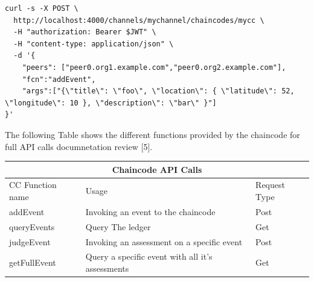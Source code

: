 \begin{lstlisting}[caption={Simple REST API Call Using Curl},captionpos=b]
curl -s -X POST \
  http://localhost:4000/channels/mychannel/chaincodes/mycc \
  -H "authorization: Bearer $JWT" \
  -H "content-type: application/json" \
  -d '{
	"peers": ["peer0.org1.example.com","peer0.org2.example.com"],
	"fcn":"addEvent",
	"args":["{\"title\": \"foo\", \"location\": { \"latitude\": 52, \"longitude\": 10 }, \"description\": \"bar\" }"]
}'
\end{lstlisting}
\bigskip
The following Table shows the different functions provided by the chaincode for full API calls documnetation review [5]. \\  

\begin{tabular}{|p{4cm}|p{6cm}|p{3cm}|  }
\hline
\multicolumn{3}{|c|}{Chaincode API Calls} \\
\hline
CC Function name& Usage &Request Type \\
\hline
addEvent & Invoking an event to the chaincode & Post \\
queryEvents & Query The ledger & Get\\
 judgeEvent &Invoking an assessment on a specific event& Post \\
getFullEvent&Query a specific event with all it's assessments& Get\\
\hline
\end{tabular}







 








 



 
  